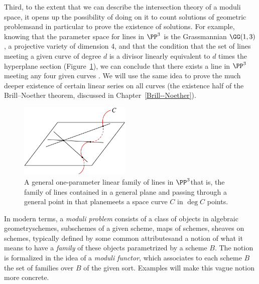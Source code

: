 Third, to the extent that we can describe the intersection theory of a
moduli space, it opens up the possibility of doing
%
on it to count solutions of geometric problems\emdash and in particular
to prove the existence of solutions. For example, knowing that the
%
parameter space for lines in $\PP^3$ is the Grassmannian $\GG(1,3)$,
%
a projective variety of dimension 4, and that the condition that the
set of lines meeting a given curve of degree $d$
is a divisor linearly equivalent to  $d$ times the hyperplane section
(Figure~\ref{Chow degree}), we can conclude  that there exists a line
in $\PP^3$ meeting any four given curves \cite[Section 3.4.1]{3264}. We
will use the same idea to prove the much deeper existence of certain
linear series on all curves (the existence half of the Brill--Noether
theorem, discussed in Chapter~\ref{Brill--Noether}).

\begin{figure}
\centerline {\includegraphics[height=1.4in]{"main/Fig06-2"}}
 \caption{A general  one-parameter linear family of lines in $\PP^3$\emdash that is, the family of lines
 contained in a general plane and passing through a general point in that plane\emdash meets a space curve $C$ in
 $\deg C$ points.}
 \label{Chow degree}
\end{figure}

In modern terms, a \emph{moduli problem}
%
consists of a class of objects
in algebraic geometry\emdash schemes, subschemes of a given scheme,
maps of schemes,
sheaves on schemes, typically defined by some common
attributes\emdash and a notion of what it means to have a \emph{family}
%
of these objects parametrized by a scheme $B$. The notion is formalized
in the idea of a \emph{moduli functor},
%
which associates to each scheme $B$ the set of families over $B$ of the
given sort. Examples will make this vague notion more concrete.


